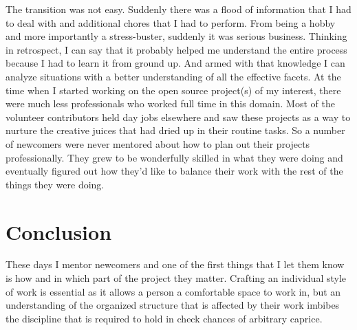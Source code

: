The transition was not easy. Suddenly there was a flood of information that I had to deal with and additional chores that I had to perform. From being a hobby and more importantly a stress-buster, suddenly it was serious business. Thinking in retrospect, I can say that it probably helped me understand the entire process because I had to learn it from ground up. And armed with that knowledge I can analyze situations with a better understanding of all the effective facets. At the time when I started working on the open source project(s) of my interest, there were much less professionals who worked full time in this domain. Most of the volunteer contributors held day jobs elsewhere and saw these projects as a way to nurture the creative juices that had dried up in their routine tasks. So a number of newcomers were never mentored about how to plan out their projects professionally. They grew to be wonderfully skilled in what they were doing and eventually figured out how they'd like to balance their work with the rest of the things they were doing.

\section*{Conclusion}

These days I mentor newcomers and one of the first things that I let them know is how and in which part of the project they matter. Crafting an individual style of work is essential as it allows a person a comfortable space to work in, but an understanding of the organized structure that is affected by their work imbibes the discipline that is required to hold in check chances of arbitrary caprice.
